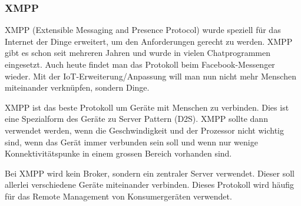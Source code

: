 \subsubsection{XMPP}
XMPP (Extensible Messaging and Presence Protocol) wurde speziell für das Internet der Dinge erweitert, um den Anforderungen gerecht zu werden. XMPP gibt es schon seit mehreren Jahren und wurde in vielen Chatprogrammen eingesetzt. Auch heute findet man das Protokoll beim Facebook-Messenger wieder. Mit der IoT-Erweiterung/Anpassung will man nun nicht mehr Menschen miteinander verknüpfen, sondern Dinge. 

XMPP ist das beste Protokoll um Geräte mit Menschen zu verbinden. Dies ist eine Spezialform des Geräte zu Server Pattern (D2S). \cite{ProtPubSub} XMPP sollte dann verwendet werden, wenn die Geschwindigkeit und der Prozessor nicht wichtig sind, wenn das Gerät immer verbunden sein soll und wenn nur wenige Konnektivitätspunke in einem grossen Bereich vorhanden sind.\cite{ProtPubSubReason}

Bei XMPP wird kein Broker, sondern ein zentraler Server verwendet. Dieser soll allerlei verschiedene Geräte miteinander verbinden. Dieses Protokoll wird häufig für das Remote Management von Konsumergeräten verwendet.

























